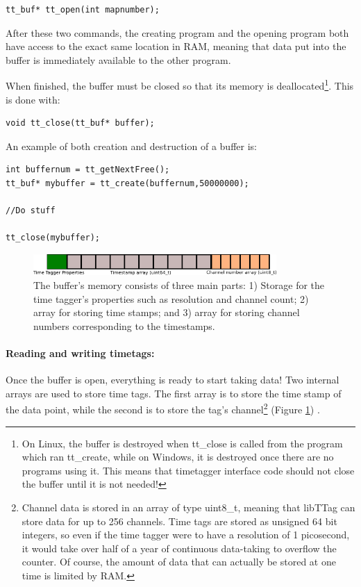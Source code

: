 \documentclass[10pt]{article}
\begin{document}
\begin{verbatim}
tt_buf* tt_open(int mapnumber);
\end{verbatim}

After these two commands, the creating program and the opening program both have access to the exact
same location in RAM, meaning that data put into the buffer is immediately available to the other program.

When finished, the buffer must be closed so that its memory is deallocated\footnote{On Linux, the buffer is destroyed when tt\_close is called from the program which ran tt\_create, while on Windows, it is
destroyed once there are no programs using it. This means that timetagger interface code should not close
the buffer until it is not needed!}. This is done with:

\begin{verbatim}
void tt_close(tt_buf* buffer);
\end{verbatim}

An example of both creation and destruction of a buffer is:

\begin{verbatim}
int buffernum = tt_getNextFree();
tt_buf* mybuffer = tt_create(buffernum,50000000);

//Do stuff

tt_close(mybuffer);

\end{verbatim}

\begin{figure}
\begin{center}
\includegraphics[width=350px]{bufferstructure.png}
\caption{The buffer's memory consists of three main parts: 1) Storage for the time tagger's properties such
as resolution and channel count; 2) array for storing time stamps; and 3) array for storing channel numbers
corresponding to the timestamps.}
\label{fig:bufferstructure}
\end{center}
\end{figure}

\paragraph{Reading and writing timetags:} Once the buffer is open, everything is ready to start taking data!
Two internal arrays are used to store time tags. The first array is to store the time stamp of the data point, while the second is to store the tag's channel\footnote{Channel data is stored in an array of type uint8\_t, meaning that libTTag can store data for up
to 256 channels. Time tags are stored as unsigned 64 bit integers, so even if the time tagger
were to have a resolution of 1 picosecond, it would take over half of a year of continuous data-taking 
to overflow the counter. Of course, the amount of data that can actually be stored at one time is limited by RAM.}
(Figure \ref{fig:bufferstructure})
.
\end{document}
